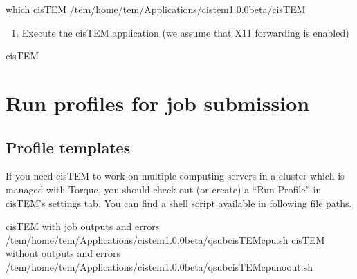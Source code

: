 \documentclass[letterpaper,10pt,english]{sphinxmanual}
\begin{document}
\begin{sphinxVerbatim}[commandchars=\\\{\}]
\PYGZdl{}\PYGZgt{} which cisTEM
/tem/home/tem/\PYGZus{}Applications/cistem\PYGZhy{}1.0.0\PYGZhy{}beta/cisTEM
\end{sphinxVerbatim}
\begin{enumerate}
\def\theenumi{\arabic{enumi}}
\def\labelenumi{\theenumi .}
\makeatletter\def\p@enumii{\p@enumi \theenumi .}\makeatother
\setcounter{enumi}{4}
\item {} 
Execute the cisTEM application (we assume that X11 forwarding is enabled)

\end{enumerate}

\begin{sphinxVerbatim}[commandchars=\\\{\}]
\PYGZdl{}\PYGZgt{} cisTEM
\end{sphinxVerbatim}



\section{Run profiles for job submission}
\label{\detokenize{cisTEM:run-profiles-for-job-submission}}

\subsection{Profile templates}
\label{\detokenize{cisTEM:profile-templates}}
If you need cisTEM to work on multiple computing servers in a cluster which is managed with Torque, you should check out (or create) a “Run Profile” in cisTEM’s settings tab.
You can find a shell script available in following file paths.

\begin{sphinxVerbatim}[commandchars=\\\{\}]
cisTEM with job outputs and errors /tem/home/tem/\PYGZus{}Applications/cistem\PYGZhy{}1.0.0\PYGZhy{}beta/qsub\PYGZhy{}cisTEM\PYGZhy{}cpu.sh
cisTEM without outputs and errors  /tem/home/tem/\PYGZus{}Applications/cistem\PYGZhy{}1.0.0\PYGZhy{}beta/qsub\PYGZhy{}cisTEM\PYGZhy{}cpu\PYGZhy{}noout.sh
\end{sphinxVerbatim}
\end{document}
